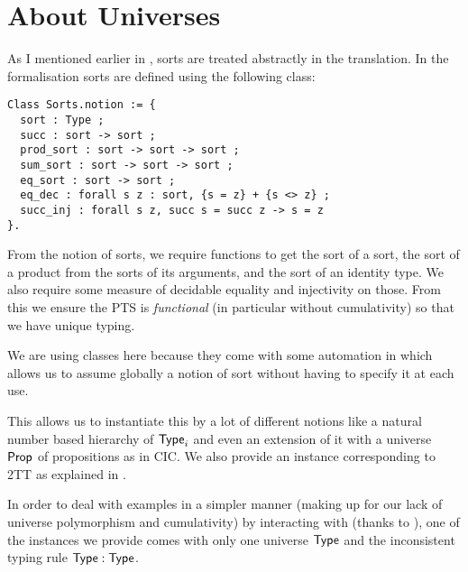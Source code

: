 

\section{About Universes}

As I mentioned earlier in , sorts are treated
abstractly in the translation. In the formalisation sorts are defined using
the following class:
%
\begin{verbatim}
Class Sorts.notion := {
  sort : Type ;
  succ : sort -> sort ;
  prod_sort : sort -> sort -> sort ;
  sum_sort : sort -> sort -> sort ;
  eq_sort : sort -> sort ;
  eq_dec : forall s z : sort, {s = z} + {s <> z} ;
  succ_inj : forall s z, succ s = succ z -> s = z
}.
\end{verbatim}
%
From the notion of sorts, we require functions to get the sort of a sort,
the sort of a product from the sorts of its arguments, and the sort of an
identity type.
We also require some measure of decidable equality and injectivity on those.
From this we ensure the \acrshort{PTS} is \emph{functional} (in particular
without cumulativity) so that we have unique typing.

We are using classes here because they come with some automation in \Coq which
allows us to assume globally a notion of sort without having to specify it at
each use.

This allows us to instantiate this by a lot of different notions like a natural
number based hierarchy of \(\mathsf{Type}_i\) and even an extension of it with a
universe $\mathsf{Prop}$ of propositions as in \acrshort{CIC}.
We also provide an instance corresponding to \acrshort{2TT} as explained in
.

In order to deal with examples in a simpler manner (making up for our lack of
universe polymorphism and cumulativity) by interacting with \Coq (thanks to
\MetaCoq), one of the instances we provide comes with only one universe $\mathsf{Type}$
and the inconsistent typing rule $\mathsf{Type} : \mathsf{Type}$.

